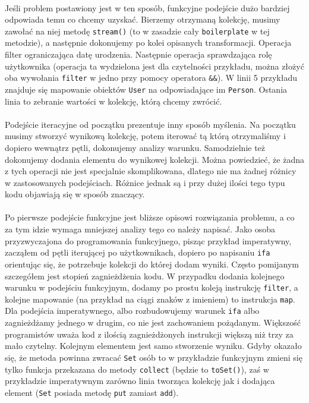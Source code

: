 \documentclass[a4paper,10pt]{report}
\begin{document}
\paragraph{}
Jeśli problem postawiony jest w ten sposób, funkcyjne podejście dużo bardziej odpowiada temu co chcemy uzyskać. Bierzemy otrzymaną kolekcję, musimy zawołać na niej metodę \verb|stream()| (to w zasadzie cały \verb|boilerplate| w tej metodzie), a następnie
dokonujemy po kolei opisanych transformacji. Operacja filter ograniczająca datę urodzenia. Następnie operacja sprawdzająca rolę użytkownika (operacja ta wydzielona jest dla czytelności przykładu, można złożyć oba wywołania \verb|filter| w jedno przy pomocy operatora
\verb|&&|). W linii 5 przykładu znajduje się mapowanie obiektów \verb|User| na odpowiadające im \verb|Person|. Ostania linia to zebranie wartości w kolekcję, którą chcemy zwrócić.
\paragraph{}
Podejście iteracyjne od początku prezentuje inny sposób myślenia. Na początku musimy stworzyć wynikową kolekcję, potem iterować tą którą otrzymaliśmy i dopiero wewnątrz pętli, dokonujemy analizy warunku. Samodzielnie też dokonujemy dodania elementu do wynikowej kolekcji. Można powiedzieć, że żadna z tych operacji nie jest specjalnie skomplikowana, dlatego nie ma żadnej różnicy w zastosowanych podejściach. Różnice jednak są i przy dużej ilości tego typu kodu objawiają się w sposób znaczący.
\paragraph{}
Po pierwsze podejście funkcyjne jest bliższe opisowi rozwiązania problemu, a co za tym idzie wymaga mniejszej analizy tego co należy napisać. Jako osoba przyzwyczajona do programowania funkcyjnego, pisząc przykład imperatywny, zacząłem od pętli iterującej po użytkownikach, dopiero po napisaniu \verb|ifa| orientując się, że potrzebuje kolekcji do której dodam wyniki. Często pomijanym szczegółem jest stopień zagnieżdżenia kodu. W przypadku dodania kolejnego warunku w podejściu funkcyjnym, dodamy po prostu koleją instrukcję \verb|filter|, a kolejne mapowanie (na przykład na ciągi znaków z imieniem) to instrukcja \verb|map|. Dla podejścia imperatywnego, albo rozbudowujemy warunek \verb|ifa| albo zagnieżdżamy jednego w drugim, co nie jest zachowaniem pożądanym. Większość programistów uważa kod z ilością zagnieżdżonych instrukcji większą niż trzy za mało czytelny. Kolejnym elementem jest samo stworzenie wyniku. Gdyby okazało się, że metoda powinna zwracać \verb|Set| osób to w przykładzie funkcyjnym zmieni się tylko funkcja przekazana do metody \verb|collect| (będzie to \verb|toSet()|), zaś w przykładzie imperatywnym zarówno linia tworząca kolekcję jak i dodająca element (\verb|Set| posiada metodę \verb|put| zamiast \verb|add|).
\end{document}
